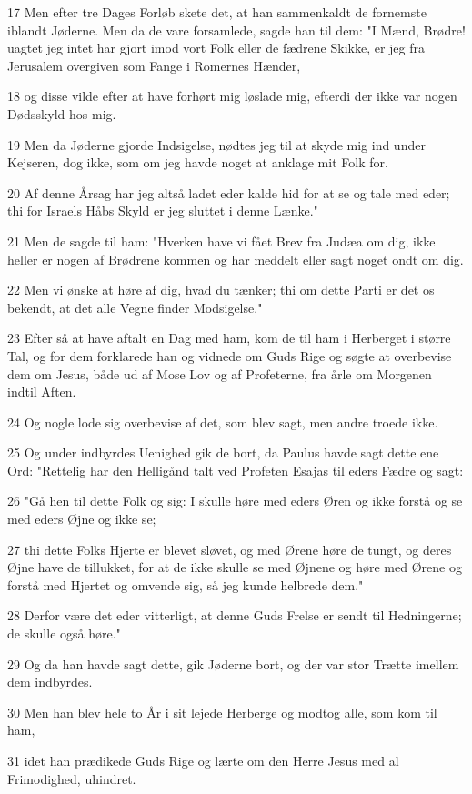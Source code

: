 \par 17 Men efter tre Dages Forløb skete det, at han sammenkaldt de fornemste iblandt Jøderne. Men da de vare forsamlede, sagde han til dem: "I Mænd, Brødre! uagtet jeg intet har gjort imod vort Folk eller de fædrene Skikke, er jeg fra Jerusalem overgiven som Fange i Romernes Hænder,
\par 18 og disse vilde efter at have forhørt mig løslade mig, efterdi der ikke var nogen Dødsskyld hos mig.
\par 19 Men da Jøderne gjorde Indsigelse, nødtes jeg til at skyde mig ind under Kejseren, dog ikke, som om jeg havde noget at anklage mit Folk for.
\par 20 Af denne Årsag har jeg altså ladet eder kalde hid for at se og tale med eder; thi for Israels Håbs Skyld er jeg sluttet i denne Lænke."
\par 21 Men de sagde til ham: "Hverken have vi fået Brev fra Judæa om dig, ikke heller er nogen af Brødrene kommen og har meddelt eller sagt noget ondt om dig.
\par 22 Men vi ønske at høre af dig, hvad du tænker; thi om dette Parti er det os bekendt, at det alle Vegne finder Modsigelse."
\par 23 Efter så at have aftalt en Dag med ham, kom de til ham i Herberget i større Tal, og for dem forklarede han og vidnede om Guds Rige og søgte at overbevise dem om Jesus, både ud af Mose Lov og af Profeterne, fra årle om Morgenen indtil Aften.
\par 24 Og nogle lode sig overbevise af det, som blev sagt, men andre troede ikke.
\par 25 Og under indbyrdes Uenighed gik de bort, da Paulus havde sagt dette ene Ord: "Rettelig har den Helligånd talt ved Profeten Esajas til eders Fædre og sagt:
\par 26 "Gå hen til dette Folk og sig: I skulle høre med eders Øren og ikke forstå og se med eders Øjne og ikke se;
\par 27 thi dette Folks Hjerte er blevet sløvet, og med Ørene høre de tungt, og deres Øjne have de tillukket, for at de ikke skulle se med Øjnene og høre med Ørene og forstå med Hjertet og omvende sig, så jeg kunde helbrede dem."
\par 28 Derfor være det eder vitterligt, at denne Guds Frelse er sendt til Hedningerne; de skulle også høre."
\par 29 Og da han havde sagt dette, gik Jøderne bort, og der var stor Trætte imellem dem indbyrdes.
\par 30 Men han blev hele to År i sit lejede Herberge og modtog alle, som kom til ham,
\par 31 idet han prædikede Guds Rige og lærte om den Herre Jesus med al Frimodighed, uhindret.



